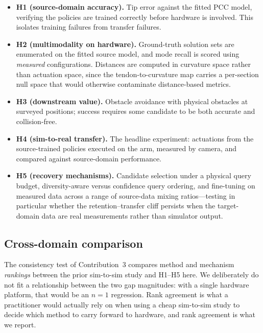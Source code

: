 \documentclass[letterpaper, 10pt, conference]{ieeeconf}
\begin{document}
\begin{itemize}
  \item \textbf{H1 (source-domain accuracy).} Tip error against the fitted
  PCC model, verifying the policies are trained correctly before hardware is
  involved. This isolates training failures from transfer failures.

  \item \textbf{H2 (multimodality on hardware).} Ground-truth solution sets
  are enumerated on the fitted source model, and mode recall is scored using
  \emph{measured} configurations. Distances are computed in curvature space
  rather than actuation space, since the tendon-to-curvature map carries a
  per-section null space that would otherwise contaminate distance-based
  metrics.

  \item \textbf{H3 (downstream value).} Obstacle avoidance with physical
  obstacles at surveyed positions; success requires some candidate to be both
  accurate and collision-free.

  \item \textbf{H4 (sim-to-real transfer).} The headline experiment:
  actuations from the source-trained policies executed on the arm, measured
  by camera, and compared against source-domain performance.

  \item \textbf{H5 (recovery mechanisms).} Candidate selection under a
  physical query budget, diversity-aware versus confidence query ordering,
  and fine-tuning on measured data across a range of source-data mixing
  ratios---testing in particular whether the retention--transfer cliff
  persists when the target-domain data are real measurements rather than
  simulator output.
\end{itemize}

\subsection{Cross-domain comparison}

The consistency test of Contribution~3 compares method and mechanism
\emph{rankings} between the prior sim-to-sim study and H1--H5 here. We
deliberately do not fit a relationship between the two gap magnitudes: with a
single hardware platform, that would be an $n{=}1$ regression. Rank agreement
is what a practitioner would actually rely on when using a cheap sim-to-sim
study to decide which method to carry forward to hardware, and rank agreement
is what we report.
\end{document}
